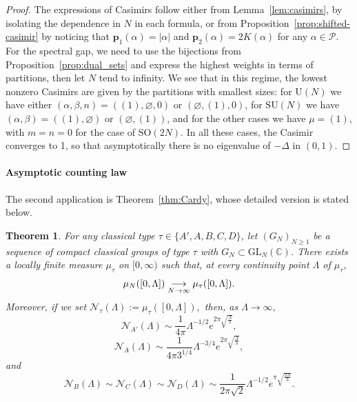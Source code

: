 \documentclass[11pt,a4paper,reqno]{article}
\newtheorem{theorem}{Theorem}[section]
\theoremstyle{definition}
\theoremstyle{remark}
\newcommand{\build}[3]{\mathrel{\mathop{\kern 0pt#1}\limits_{#2}^{#3}}}
\newcommand\SU{{\mathrm{SU}}}
\newcommand\SO{{\mathrm{SO}}}
\newcommand\GL{{\mathrm{GL}}}
\newcommand\U{{\mathrm U}}
\newcommand\C{\mathbb{C}}
\newcommand\Pfr{\mathscr{P}}
\begin{document}
\begin{proof}
The expressions of Casimirs follow either from Lemma~\ref{lem:casimirs}, by isolating the dependence in $N$ in each formula, or from Proposition~\ref{prop:shifted-casimir} by noticing that $\mathbf{p}_1(\alpha)=\vert\alpha\vert$ and $\mathbf{p}_2(\alpha)=2K(\alpha)$ for any $\alpha\in\Pfr.$ For the spectral gap, we need to use the bijections from Proposition~\ref{prop:dual_sets} and express the highest weights in terms of partitions, then let $N$ tend to infinity. We see that in this regime, the lowest nonzero Casimirs are given by the partitions with smallest sizes: for $\U(N)$ we have either $(\alpha,\beta,n)=((1),\varnothing,0)$ or $(\varnothing,(1),0)$, for $\SU(N)$ we have $(\alpha,\beta)=((1),\varnothing)$ or $(\varnothing,(1))$, and for the other cases we have $\mu=(1)$, with $m=n=0$ for the case of $\SO(2N)$. In all these cases, the Casimir converges to 1, so that asymptotically there is no eigenvalue of $-\Delta$ in $(0,1)$.
\end{proof}

\paragraph{Asymptotic counting law}

The second application is Theorem~\ref{thm:Cardy}, whose detailed version is stated below.

\begin{theorem}\label{thm:Cardy-detailed}
For any classical type $\tau\in\{A',A,B,C,D\}$, let $(G_N)_{N\geq1}$ be a sequence of compact classical groups of type $\tau$ with $G_N\subset\GL_N(\C)$.
 There exists a locally finite measure $\mu_\tau$ on $[0,\infty)$ such that, at every
continuity point $\Lambda$ of $\mu_\tau$,
\begin{equation}\label{eq:cv_continuitypoint}
\mu_N([0,\Lambda])\build{\longrightarrow}{N\to\infty}{} \mu_\tau([0,\Lambda]).
\end{equation}
Moreover, if we set $\mathcal{N}_\tau(\Lambda):=\mu_\tau([0,\Lambda]),$ then, as $\Lambda\to\infty$,
\begin{equation}\label{eq:Cardy1}
\mathcal{N}_{A'}(\Lambda)\sim \frac{1}{4\pi}\Lambda^{-1/2}
e^{2\pi\sqrt{\frac{\Lambda}{3}}},
\end{equation}
\begin{equation}\label{eq:Cardy2}
\mathcal{N}_A(\Lambda)\sim \frac{1}{4\pi3^{1/4}}\Lambda^{-3/4}
e^{2\pi\sqrt{\frac{\Lambda}{3}}},
\end{equation}
and
\begin{equation}\label{eq:Cardy3}
\mathcal{N}_B(\Lambda)\sim \mathcal{N}_C(\Lambda)\sim \mathcal{N}_D(\Lambda)\sim
\frac{1}{2\pi\sqrt{2}}\Lambda^{-1/2}
e^{\pi\sqrt{\frac{2\Lambda}{3}}}.
\end{equation}
\end{theorem}
\end{document}
